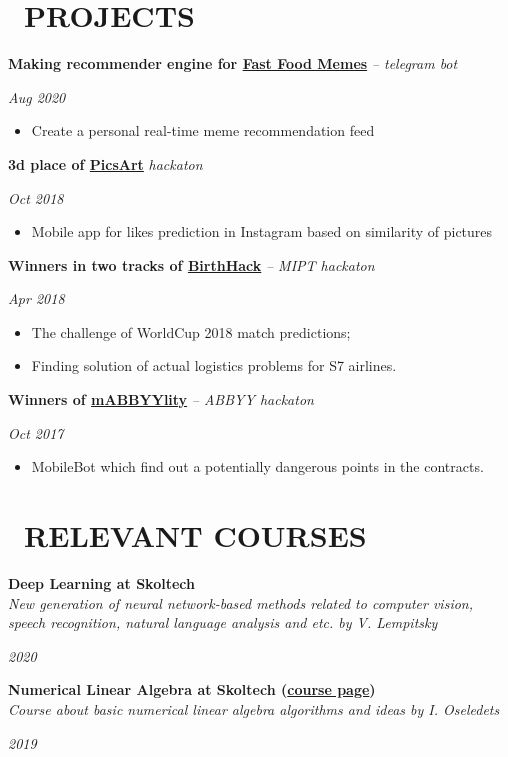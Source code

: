 \documentclass[11pt,a4paper,roman]{moderncv}
\newcommand*{\cvcourse}[3]{
    \parbox[t]{0.78\textwidth}{
        {\bfseries #2} \\ {\itshape #3}
    }
    \parbox[t]{0.22\textwidth}{
    \hfill {\itshape #1}}
}
\newcommand*{\cvhack}[3]{
    \parbox[t]{0.78\textwidth}{
        {\bfseries #2} {\itshape #3}
    }
    \parbox[t]{0.22\textwidth}{
    \hfill {\itshape #1}}
}
\begin{document}
\section{\faRocket~PROJECTS}

\cvhack{Aug 2020}
       {Making recommender engine for \href{https://ffmemes.com}{Fast Food Memes}}
       { -- telegram bot}
\begin{itemize}
    \item Create a personal real-time meme recommendation feed
\end{itemize}

\cvhack{Oct 2018}
        {3d place of \href{https://www.picsart.ai/winners}{PicsArt}}
        {hackaton}
\begin{itemize}
    \item Mobile app for likes prediction in Instagram based on similarity of pictures
\end{itemize}

\cvhack{Apr 2018}
        {Winners in two tracks of \href{https://github.com/HackFactory/BirthHack}{BirthHack}}
        {-- MIPT hackaton}
\begin{itemize}
    \item The challenge of WorldCup 2018 match predictions;
    \item Finding solution of actual logistics problems for S7 airlines.
\end{itemize}

\cvhack{Oct 2017}
        {Winners of \href{https://vk.com/mabbyylity?w=wall-152623487_85}{mABBYYlity}}
        {-- ABBYY hackaton}
\begin{itemize}
    \item MobileBot which find out a potentially dangerous points in the contracts.
\end{itemize}
\section{\faCertificate~RELEVANT COURSES}

\cvcourse{2020}
          {Deep Learning at Skoltech}
          {New generation of neural network-based methods related to computer vision, speech recognition, natural language analysis and etc. by V. Lempitsky}
          
\cvcourse{2019}
          {Numerical Linear Algebra at Skoltech (\href{http://nla.skoltech.ru}{course page})}
          {Course about basic numerical linear algebra algorithms and ideas by I. Oseledets}
          
\end{document}
